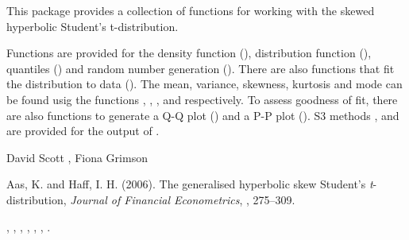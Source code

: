 \documentclass{book}
\begin{document}
\begin{Description}\relax
This package provides a collection of functions for working with the
skewed hyperbolic Student's t-distribution.

Functions are provided for the density function (),
distribution function (), quantiles () and
random number generation (). There are also functions
that fit the distribution to data (). The mean,
variance, skewness, kurtosis and mode can be found usig the functions
, , ,
 and  respectively. To assess
goodness of fit, there are also functions to generate a Q-Q plot
() and a P-P plot (). S3 methods
,  and  are provided for the output
of .

\end{Description}
\begin{Author}\relax
David Scott , Fiona Grimson
\end{Author}
\begin{References}\relax
Aas, K. and Haff, I. H. (2006).
The generalised hyperbolic skew Student's \emph{t}-distribution,
\emph{Journal of Financial Econometrics}, , 275--309.
\end{References}
\begin{SeeAlso}\relax
{}, ,
, ,
, ,
.
\end{SeeAlso}
\end{document}
